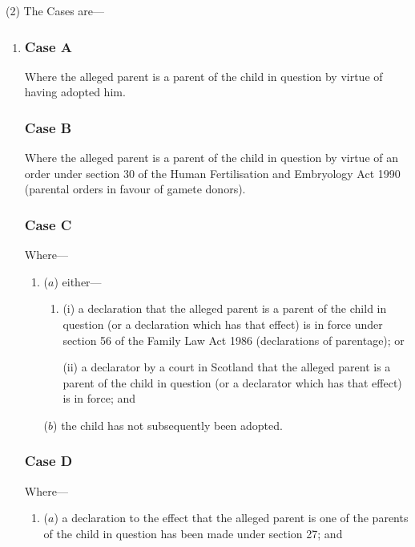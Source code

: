 \documentclass[12pt,a4paper]{article}
\begin{document}
(2) The Cases are—
\begin{enumerate}\item[]
    \subsubsection*{Case A}

    Where the alleged parent is a parent of the child in question by virtue of having adopted him.

    \subsubsection*{Case B}

    Where the alleged parent is a parent of the child in question by virtue of an order under section 30 of the Human Fertilisation and Embryology Act 1990 (parental orders in favour of gamete donors).

    \subsubsection*{Case C}

    Where—
\begin{enumerate}\item[]
    ($a$) 
    either—
\begin{enumerate}\item[]
    (i) 
    a declaration that the alleged parent is a parent of the child in question (or a declaration which has that effect) is in force under section 56 of the Family Law Act 1986 (declarations of parentage); or

    (ii) 
    a declarator by a court in Scotland that the alleged parent is a parent of the child in question (or a declarator which has that effect) is in force; and
\end{enumerate}

    ($b$) 
    the child has not subsequently been adopted.
\end{enumerate}

    \subsubsection*{Case D}

    Where—
\begin{enumerate}\item[]
    ($a$) 
    a declaration to the effect that the alleged parent is one of the parents of the child in question has been made under section 27; and


\end{enumerate}
\end{enumerate}
\end{document}
